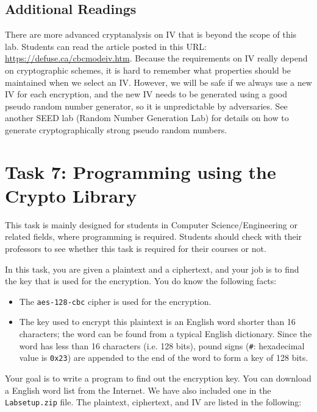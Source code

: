 \subsection{Additional Readings}

There are more advanced cryptanalysis on IV that is beyond the scope of this lab. Students 
can read the article posted in this URL: \url{https://defuse.ca/cbcmodeiv.htm}. 
Because the requirements on IV really depend on cryptographic schemes, it is hard to
remember what properties should be maintained when we select an IV.
However, we will be safe if we always use a new IV for each encryption, and the 
new IV needs to be generated using a good pseudo random number 
generator, so it is unpredictable by adversaries. 
See another SEED lab (Random Number Generation Lab) for 
details on how to generate cryptographically strong pseudo random numbers. 



\section{Task 7: Programming using the Crypto Library}

This task is mainly designed for students in Computer Science/Engineering
or related fields, where programming is required. Students should
check with their professors to see whether this task is required 
for their courses or not.


In this task, you are given a plaintext and a ciphertext, and 
your job is to find the key that is used for the encryption. 
You do know the following facts:

\begin{itemize} 
\item The {\tt aes-128-cbc} cipher is used for the encryption. 
\item The key used to encrypt this plaintext is an English
word shorter than 16 characters; the word can be found from a typical 
English dictionary.  Since the word has less than 16 characters (i.e. 128
bits), pound signs (\texttt{\#}: hexadecimal value is \texttt{0x23}) 
are appended to the end of the word to form a key of 128 bits.
\end{itemize} 
  

Your goal is to write a program to 
find out the encryption key. You can download a English word list 
from the Internet.  We have also included one in
the \texttt{Labsetup.zip} file.  
The plaintext, ciphertext, and IV are listed in the following:


